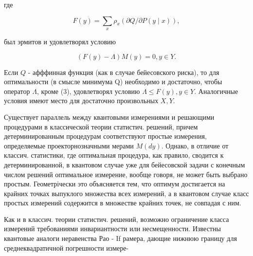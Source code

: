 \documentclass[10pt]{article}
\begin{document}
где



\[

F(y)=\sum_{x} \rho_{x}(\partial Q / \partial P(y \mid x)),

\]



был эрмитов и удовлетворял условию



\[

(F(y)-\Lambda) M(y)=0, y \in Y .

\]



Если $Q$ - афффинная функция (как в случае бейесовского риска), то для оптимальности (в смысле минимума Q) необходимо и достаточно, чтобы оператор $\Lambda$, кроме (3), удовлетворял условию $\Lambda \leqslant F(y), y \in Y$. Аналогичные условия имеют место для достаточно произвольных $X, Y$.



Существует параллель между квантовыми измерениями и решающими процедурами в классической теории статистич. решений, причем детерминированным процедурам соответствуют простые измерения, определяемые проекторнозначными мерами $M(d y)$. Однако, в отличие от классич. статистики, где оптимальная процедура, как правило, сводится к детерминированной, в квантовом случае уже для бейесовской задачи с конечным числом решений оптимальное измерение, вообще говоря, не может быть выбрано простым. Геометрічески это объясняется тем, что оптимум достигается на крайних точках выпуклого множества всех измерений, а в квантовом случае класс простых измерений содержится в множестве крайних точек, не совпадая с ним.



Как и в классич. теории статистич. решений, возможно ограничение класса измерений требованиями инвариантности или несмещенности. Известны квантовые аналоги неравенства Рао - If рамера, дающие нижнюю границу для среднеквадратичной погрешности измере-
\end{document}
